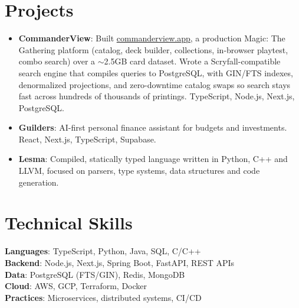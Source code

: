 \documentclass[a4paper,11pt]{article}
\newcommand{\resumeItem}[2]{
  \item\small{
    \textbf{#1}{: #2 \vspace{-2pt}}
  }
}
\newcommand{\resumeSubItem}[2]{\resumeItem{#1}{#2}\vspace{-4pt}}
\newcommand{\resumeSubHeadingListStart}{\begin{itemize}[leftmargin=0.15in, label={}]}
\newcommand{\resumeSubHeadingListEnd}{\end{itemize}}
\begin{document}
\section{Projects}
\resumeSubHeadingListStart
\resumeSubItem{CommanderView}
{Built \href{https://commanderview.app}{\underline{commanderview.app}}, a production Magic: The Gathering platform (catalog, deck builder, collections, in-browser playtest, combo search) over a $\sim$2.5GB card dataset. Wrote a Scryfall-compatible search engine that compiles queries to PostgreSQL, with GIN/FTS indexes, denormalized projections, and zero-downtime catalog swaps so search stays fast across hundreds of thousands of printings. TypeScript, Node.js, Next.js, PostgreSQL.}
\resumeSubItem{Guilders}
{AI-first personal finance assistant for budgets and investments. React, Next.js, TypeScript, Supabase.}
\resumeSubItem{Lesma}
{Compiled, statically typed language written in Python, C++ and LLVM, focused on parsers, type systems, data structures and code generation.}
\resumeSubHeadingListEnd

\section{Technical Skills}
\begin{itemize}[leftmargin=0.15in, label={}]
  \small{\item{
        \textbf{Languages}{: TypeScript, Python, Java, SQL, C/C++} \\
        \textbf{Backend}{: Node.js, Next.js, Spring Boot, FastAPI, REST APIs} \\
        \textbf{Data}{: PostgreSQL (FTS/GIN), Redis, MongoDB} \\
        \textbf{Cloud}{: AWS, GCP, Terraform, Docker} \\
        \textbf{Practices}{: Microservices, distributed systems, CI/CD}
        }}
\end{itemize}
\end{document}
